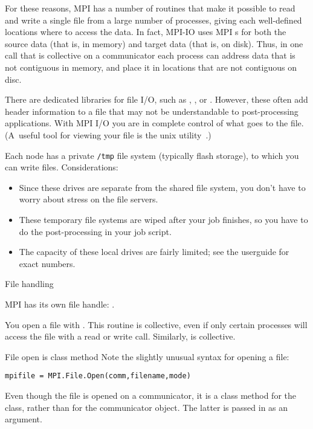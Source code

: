 For these reasons, MPI has a number of routines that make it possible
to read and write a single file from a large number of processes,
giving each well-defined locations where to access the data.
In fact, MPI-IO uses MPI
s for both the source data (that is, in memory)
and target data (that is, on disk).
Thus, in one call that is collective on a communicator
each process can address data that is not contiguous in memory,
and place it in locations that are not contiguous on disc.

There are dedicated libraries for file I/O, such as ,
, or . However, these often add
header information to a file that may not be understandable to
post-processing applications. With MPI I/O you are in complete control
of what goes to the file. (A~useful tool for viewing your file is the
unix utility~.)

\begin{taccnote}
  Each node has a private \verb+/tmp+ file system
  (typically flash storage), to which
  you can write files. Considerations:
  \begin{itemize}
  \item Since these drives are separate from the shared file system,
    you don't have to worry about stress on the file servers.
  \item These temporary file systems are wiped after your job finishes,
    so you have to do the post-processing in your job script.
  \item The capacity of these local drives are fairly limited;
    see the userguide for exact numbers.
  \end{itemize}
\end{taccnote}

 {File handling}

MPI has its own file handle:
.

You open a file with
%
.
%
This routine is collective, even if only certain processes will access
the file with a read or write call.
Similarly,  is collective.

\begin{pythonnote}{File open is class method}
  Note the slightly unusual syntax for opening a file:
\begin{lstlisting}
mpifile = MPI.File.Open(comm,filename,mode)
\end{lstlisting}
  Even though the file is
  opened on a communicator, it is a class method for the 
  class, rather than for the communicator object. The latter is passed
  in as an argument.
\end{pythonnote}

